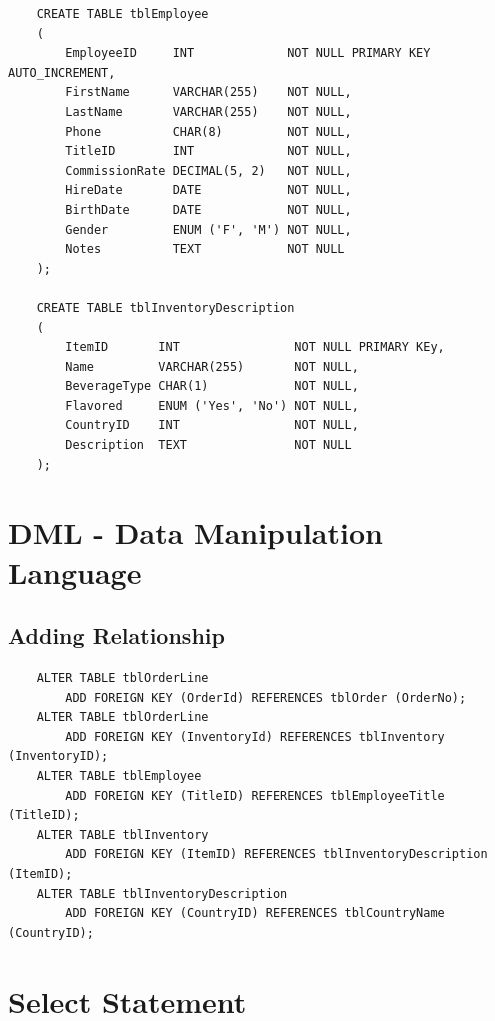 \documentclass[12pt,titlepage]{article}
\begin{document}
\begin{verbatim}
    CREATE TABLE tblEmployee
    (
        EmployeeID     INT             NOT NULL PRIMARY KEY AUTO_INCREMENT,
        FirstName      VARCHAR(255)    NOT NULL,
        LastName       VARCHAR(255)    NOT NULL,
        Phone          CHAR(8)         NOT NULL,
        TitleID        INT             NOT NULL,
        CommissionRate DECIMAL(5, 2)   NOT NULL,
        HireDate       DATE            NOT NULL,
        BirthDate      DATE            NOT NULL,
        Gender         ENUM ('F', 'M') NOT NULL,
        Notes          TEXT            NOT NULL
    );
    
    CREATE TABLE tblInventoryDescription
    (
        ItemID       INT                NOT NULL PRIMARY KEy,
        Name         VARCHAR(255)       NOT NULL,
        BeverageType CHAR(1)            NOT NULL,
        Flavored     ENUM ('Yes', 'No') NOT NULL,
        CountryID    INT                NOT NULL,
        Description  TEXT               NOT NULL
    );
\end{verbatim}

\section{DML - Data Manipulation Language}
\subsection{Adding Relationship}
\begin{verbatim}
    ALTER TABLE tblOrderLine
        ADD FOREIGN KEY (OrderId) REFERENCES tblOrder (OrderNo);
    ALTER TABLE tblOrderLine
        ADD FOREIGN KEY (InventoryId) REFERENCES tblInventory (InventoryID);
    ALTER TABLE tblEmployee
        ADD FOREIGN KEY (TitleID) REFERENCES tblEmployeeTitle (TitleID);
    ALTER TABLE tblInventory
        ADD FOREIGN KEY (ItemID) REFERENCES tblInventoryDescription (ItemID);
    ALTER TABLE tblInventoryDescription
        ADD FOREIGN KEY (CountryID) REFERENCES tblCountryName (CountryID);
\end{verbatim}

\section{Select Statement}
\end{document}
